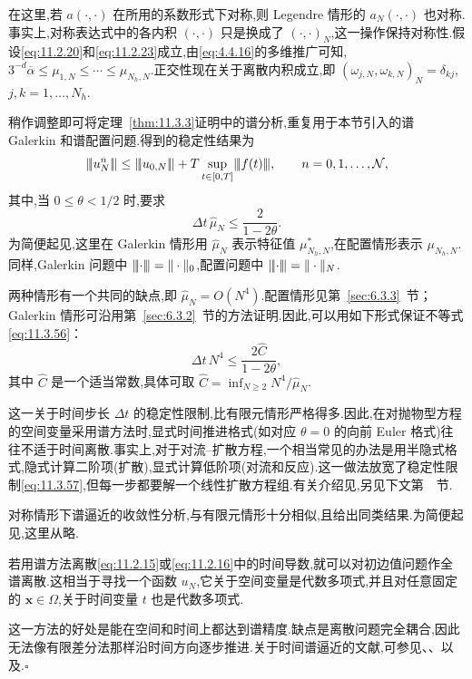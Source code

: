 在这里,若 \(a(\cdot,\cdot)\) 在所用的系数形式下对称,则 Legendre 情形的 \(a_N(\cdot,\cdot)\) 也对称.事实上,对称表达式中的各内积 \((\cdot,\cdot)\) 只是换成了 \((\cdot,\cdot)_N\),这一操作保持对称性.假设\eqref{eq:11.2.20}和\eqref{eq:11.2.23}成立,由\eqref{eq:4.4.16}的多维推广可知,\(3^{-d}\overline\alpha\le\mu_{1,N}\le\cdots\le\mu_{N_h,N}\).正交性现在关于离散内积成立,即 \((\omega_{j,N},\omega_{k,N})_N=\delta_{kj}\),\(j,k=1,\ldots,N_h\).

稍作调整即可将定理~\ref{thm:11.3.3}证明中的谱分析,重复用于本节引入的谱 Galerkin 和谱配置问题.得到的稳定性结果为
\begin{equation}\label{eq:11.3.55}
  \lVert\!\lvert u_N^n\rvert\!\rVert\le\lVert\!\lvert u_{0,N}\rvert\!\rVert+T\sup_{t\in[0,T]}\lVert\!\lvert f(t)\rvert\!\rVert,
       \qquad n=0,1,\ldots,\mathcal N,
\end{equation}
其中,当 \(0\le\theta<1/2\) 时,要求
\begin{equation}\label{eq:11.3.56}
  \Delta t\,\widehat\mu_N\le\frac2{1-2\theta}.
\end{equation}
为简便起见,这里在 Galerkin 情形用 \(\widehat\mu_N\) 表示特征值 \(\mu_{N_h,N}^*\),在配置情形表示 \(\mu_{N_h,N}\).同样,Galerkin 问题中 \(\lVert\!\lvert \cdot\rvert\!\rVert=\|\cdot\|_0\),配置问题中 \(\lVert\!\lvert \cdot\rvert\!\rVert=\|\cdot\|_N\).

两种情形有一个共同的缺点,即 \(\widehat\mu_N=O(N^4)\).配置情形见第~\ref{sec:6.3.3}~节；Galerkin 情形可沿用第~\ref{sec:6.3.2}~节的方法证明.因此,可以用如下形式保证不等式\eqref{eq:11.3.56}：
\begin{equation}\label{eq:11.3.57}
  \Delta t\,N^4\le\frac{2\widehat C}{1-2\theta},
\end{equation}
其中 \(\widehat C\) 是一个适当常数,具体可取 \(\widehat C=\inf_{N\ge2}N^4/\widehat\mu_N\).

这一关于时间步长 \(\Delta t\) 的稳定性限制,比有限元情形严格得多.因此,在对抛物型方程的空间变量采用谱方法时,显式时间推进格式(如对应 \(\theta=0\) 的向前 Euler 格式)往往不适于时间离散.事实上,对于对流--扩散方程,一个相当常见的办法是用半隐式格式,隐式计算二阶项(扩散),显式计算低阶项(对流和反应).这一做法放宽了稳定性限制\eqref{eq:11.3.57},但每一步都要解一个线性扩散方程组.有关介绍见,另见下文第~~节.

对称情形下谱逼近的收敛性分析,与有限元情形十分相似,且给出同类结果.为简便起见,这里从略.

\begin{note}
若用谱方法离散\eqref{eq:11.2.15}或\eqref{eq:11.2.16}中的时间导数,就可以对初边值问题作全谱离散.这相当于寻找一个函数 \(u_N\),它关于空间变量是代数多项式,并且对任意固定的 \(\boldsymbol{x}\in\Omega\),关于时间变量 \(t\) 也是代数多项式.

这一方法的好处是能在空间和时间上都达到谱精度.缺点是离散问题完全耦合,因此无法像有限差分法那样沿时间方向逐步推进.关于时间谱逼近的文献,可参见、、以及.\hfill\(\square\)
\end{note}


